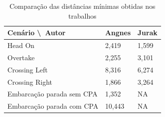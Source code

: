         
        \begin{table}[]
            \centering
            \begin{tabular}{|M{5cm}|M{5cm}|M{5cm}|}
                \hline
                Cenário \textbackslash~Autor & Angnes & Jurak \\ [2ex]\hline
                Head On                      & 2,419  & 1,599 \\ [2ex]\hline
                Overtake                     & 2,255  & 3,101 \\ [2ex]\hline
                Crossing Left                & 8,316  & 6,274 \\ [2ex]\hline
                Crossing Right               & 1,866  & 3,264 \\ [2ex]\hline
                Embarcação parada sem CPA    & 1,352  & NA    \\ [2ex]\hline
                Embarcação parada com CPA    & 10,443 & NA    \\ [2ex]\hline
            \end{tabular}
            \caption{Comparação das distâncias mínimas obtidas nos trabalhos}
            \label{tab:chap5_comparacao_resultados}
        \end{table}